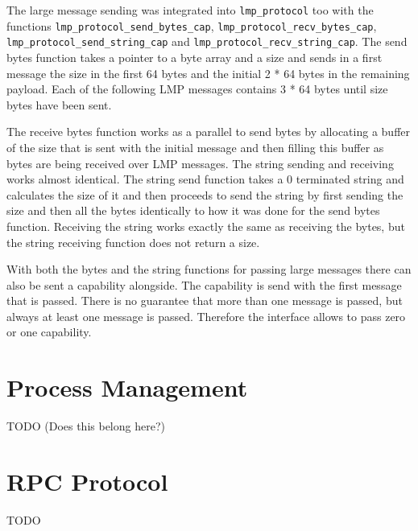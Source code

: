 The large message sending was integrated into \verb|lmp_protocol| too with the functions \verb|lmp_protocol_send_bytes_cap|, \verb|lmp_protocol_recv_bytes_cap|, \verb|lmp_protocol_send_string_cap| and \verb|lmp_protocol_recv_string_cap|. The send bytes function takes a pointer to a byte array and a size and sends in a first message the size in the first 64 bytes and the initial 2 * 64 bytes in the remaining payload. Each of the following LMP messages contains 3 * 64 bytes until size bytes have been sent.

The receive bytes function works as a parallel to send bytes by allocating a buffer of the size that is sent with the initial message and then filling this buffer as bytes are being received over LMP messages.
The string sending and receiving works almost identical. The string send function takes a 0 terminated string and calculates the size of it and then proceeds to send the string by first sending the size and then all the bytes identically to how it was done for the send bytes function. Receiving the string works exactly the same as receiving the bytes, but the string receiving function does not return a size.

With both the bytes and the string functions for passing large messages there can also be sent a capability alongside. The capability is send with the first message that is passed. There is no guarantee that more than one message is passed, but always at least one message is passed. Therefore the interface allows to pass zero or one capability.

\section{Process Management}

TODO
(Does this belong here?)

\section{RPC Protocol}

TODO
